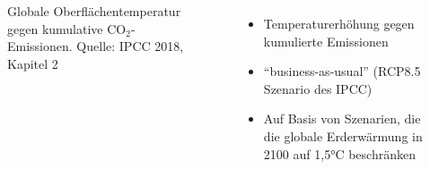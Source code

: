 \begin{frame}
\begin{columns}
\begin{figure}
		    \caption{Globale Oberflächentemperatur gegen kumulative CO$_2$-Emissionen. Quelle: IPCC 2018, Kapitel 2}
      \end{figure}
      \begin{itemize}
        \item Temperaturerhöhung gegen kumulierte Emissionen
        \item \enquote{business-as-usual} (RCP8.5 Szenario des IPCC)
        \item Auf Basis von Szenarien, die die globale Erderwärmung in 2100 auf 1,5°C beschränken

\end{itemize}
\end{columns}
\end{frame}

